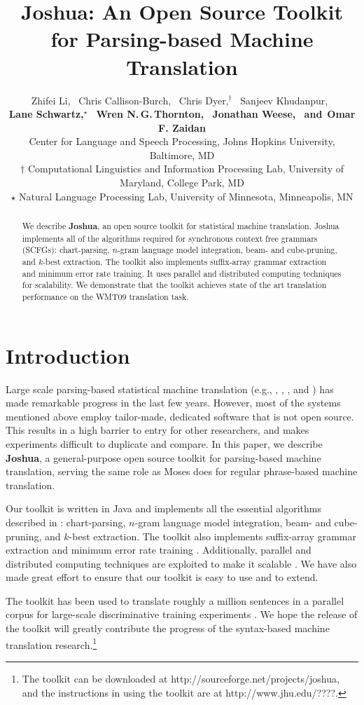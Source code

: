 \documentclass[11pt]{article}
\title{Joshua: An Open Source Toolkit for Parsing-based Machine Translation}
\author{
Zhifei Li,\,\,\,
Chris Callison-Burch,\,\,\, %
Chris Dyer,$^\dagger$\,\,\,
Sanjeev Khudanpur,\,\,\, \\
{\bf Lane Schwartz,$^\star$\,\,\,
Wren N.\,G.\,Thornton,\,\,\,
Jonathan Weese,\,\,\,
{\textnormal{ and}}\,\,\,Omar F. Zaidan}\\
Center for Language and Speech Processing, Johns Hopkins University, Baltimore, MD\\
$\dagger$ Computational Linguistics and Information Processing Lab, University of Maryland, College Park, MD\\
$\star$ Natural Language Processing Lab, University of Minnesota, Minneapolis, MN}
\date{}
\begin{document}
\maketitle

\begin{abstract}
We describe \textbf{Joshua}, an open source toolkit for statistical machine translation.  Joshua implements all of the algorithms required for synchronous context free grammars (SCFGs): chart-parsing, $n$-gram language model integration, beam- and cube-pruning, and $k$-best extraction. The toolkit also implements suffix-array grammar extraction and minimum error rate training. It uses parallel and distributed computing techniques for scalability. We demonstrate that the toolkit achieves state of the art translation performance on the WMT09 translation task.

\end{abstract}


\section{Introduction}
Large scale parsing-based statistical machine translation (e.g., , , , and ) has made remarkable progress in the last few years.
However, most of the systems mentioned above employ tailor-made, dedicated software that is not open source.  This results in a high barrier to entry for other researchers, and makes experiments difficult to duplicate and compare.
In this paper, we describe \textbf{Joshua}, a general-purpose open source toolkit for parsing-based machine translation, serving the same role as Moses \cite{Moses} does for regular phrase-based machine translation.

Our toolkit is written in Java and implements all the essential algorithms described in : chart-parsing, $n$-gram language model integration, beam- and cube-pruning, and $k$-best extraction.  The toolkit also implements suffix-array grammar extraction \cite{Lopez2007} and minimum error rate training \cite{Och2003c}. Additionally, parallel and distributed computing techniques are exploited to make it scalable \cite{Li2008b}. We have also made great effort to ensure that our toolkit is easy to use and to extend.

The toolkit has been used to translate roughly a million sentences in a parallel corpus for large-scale discriminative training experiments \cite{Li2008}.
We hope the release of the toolkit will greatly contribute the progress of the syntax-based machine translation research.\footnote{The toolkit can be downloaded at http://sourceforge.net/projects/joshua, and the instructions in using the toolkit are at http://www.jhu.edu/????.}
\end{document}

